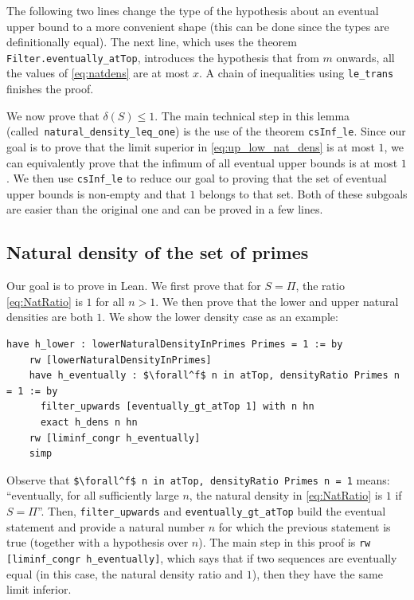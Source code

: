 \documentclass[a4paper,11pt]{article}
\theoremstyle{plain}
\begin{document}
    The following two lines change the type of the hypothesis about an eventual upper bound to a more convenient shape (this can be done since the types are definitionally equal). The next line, which uses the theorem \lstinline|Filter.eventually_atTop|, introduces the hypothesis that from $m$ onwards, all the values of \eqref{eq:natdens} are at most $x$. A chain of inequalities using \lstinline|le_trans| finishes the proof.

    We now prove that $\delta(S)\leq 1$. The main technical step in this lemma (\mbox{called \lstinline|natural_density_leq_one|}) is the use of the theorem \lstinline|csInf_le|. Since our goal is to prove that the limit superior in \eqref{eq:up_low_nat_dens} is at most $1$, we can equivalently prove that the infimum of all eventual upper bounds is at most $1$. We then use \lstinline|csInf_le| to reduce our goal to proving that the set of eventual upper bounds is non-empty and that $1$ belongs to that set. Both of these subgoals are easier than the original one and can be proved in a few lines.

    \subsection{Natural density of the set of primes}

    Our goal is to prove  in Lean. We first prove that for $S=\Pi$, the ratio \eqref{eq:NatRatio} is $1$ for all $n>1$. We then prove that the lower and upper natural densities are both $1$. We show the lower density case as an example:\\
    \begin{lstlisting}[caption={(Part of the) proof that the lower natural density of $\Pi$ is $1$.}, label={list:5}]
	have h_lower : lowerNaturalDensityInPrimes Primes = 1 := by
    rw [lowerNaturalDensityInPrimes]
    have h_eventually : $\forall^f$ n in atTop, densityRatio Primes n = 1 := by
      filter_upwards [eventually_gt_atTop 1] with n hn
      exact h_dens n hn
    rw [liminf_congr h_eventually]
    simp
	\end{lstlisting}
    Observe that \lstinline{$\forall^f$ n in atTop, densityRatio Primes n = 1} means: ``eventually, for all sufficiently large $n$, the natural density in \eqref{eq:NatRatio} is $1$ if $S=\Pi$''. Then, \lstinline|filter_upwards| and \lstinline|eventually_gt_atTop| build the eventual statement and provide a natural number $n$ for which the previous statement is true (together with a hypothesis over $n$). The main step in this proof is \lstinline|rw [liminf_congr h_eventually]|, which says that if two sequences are eventually equal (in this case, the natural density ratio and $1$), then they have the same limit inferior.
\end{document}
